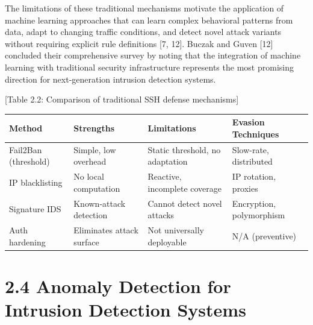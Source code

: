 \documentclass[
  a4paper]{report}
\newcounter{none} %
\begin{document}
The limitations of these traditional mechanisms motivate the application
of machine learning approaches that can learn complex behavioral
patterns from data, adapt to changing traffic conditions, and detect
novel attack variants without requiring explicit rule definitions {[}7,
12{]}. Buczak and Guven {[}12{]} concluded their comprehensive survey by
noting that the integration of machine learning with traditional
security infrastructure represents the most promising direction for
next-generation intrusion detection systems.

{[}Table 2.2: Comparison of traditional SSH defense mechanisms{]}

{\def\LTcaptype{none} %
\begin{longtable}[]{@{}
  >{\raggedright\arraybackslash}p{}
  >{\raggedright\arraybackslash}p{}
  >{\raggedright\arraybackslash}p{}
  >{\raggedright\arraybackslash}p{}@{}}
\toprule\noalign{}
\begin{minipage}[b]{\linewidth}\raggedright
Method
\end{minipage} & \begin{minipage}[b]{\linewidth}\raggedright
Strengths
\end{minipage} & \begin{minipage}[b]{\linewidth}\raggedright
Limitations
\end{minipage} & \begin{minipage}[b]{\linewidth}\raggedright
Evasion Techniques
\end{minipage} \\
\midrule\noalign{}
\endhead
\bottomrule\noalign{}
\endlastfoot
Fail2Ban (threshold) & Simple, low overhead & Static threshold, no
adaptation & Slow-rate, distributed \\
IP blacklisting & No local computation & Reactive, incomplete coverage &
IP rotation, proxies \\
Signature IDS & Known-attack detection & Cannot detect novel attacks &
Encryption, polymorphism \\
Auth hardening & Eliminates attack surface & Not universally deployable
& N/A (preventive) \\
\end{longtable}
}

\section{2.4 Anomaly Detection for Intrusion Detection
Systems}\label{anomaly-detection-for-intrusion-detection-systems}
\end{document}
